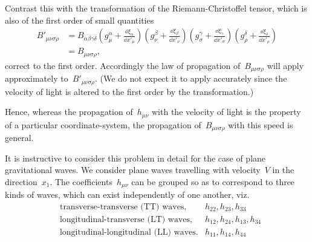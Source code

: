 \documentclass[12pt]{book}
\begin{document}
Contrast this with the transformation of the Riemann-Christoffel tensor, which is also of the first order of small
quantities
\begin{align*}
B'_{\mu\nu\sigma\rho} & = B_{\alpha\beta\gamma\delta}
                              \left(g^\alpha_\mu    + \frac{\dd\xi_\alpha}{\dd x'_\mu}\right)
                              \left(g^\beta_\nu     + \frac{\dd\xi_\beta} {\dd x'_\nu}\right)
                              \left(g^\gamma_\sigma + \frac{\dd\xi_\gamma}{\dd x'_\sigma}\right)
                              \left(g^\delta_\rho   + \frac{\dd\xi_\delta}{\dd x'_\rho}\right)\\
                      & = B_{\mu\nu\sigma\rho},
\end{align*}
correct to the first order.
Accordingly the law of propagation of~$B_{\mu\nu\sigma\rho}$ will apply approximately to~$B'_{\mu\nu\sigma\rho}$.
(We do not expect it to apply accurately since the velocity of light is altered to the first order by the
transformation.)

Hence, whereas the propagation of~$h_{\mu\nu}$ with the velocity of light is the property of a particular
coordinate-system, the propagation of~$B_{\mu\nu\sigma\rho}$ with this speed is general.

It is instructive to consider this problem in detail for the case of plane gravitational waves.
We consider plane waves travelling with velocity~$V$ in the direction~$x_1$.
The coefficients~$h_{\mu\nu}$ can be grouped so as to correspond to three kinds of waves, which can exist
independently of one another, viz.
\begin{align*}%
& \text{transverse-transverse (TT) waves,}     & h_{22}, h_{23}, h_{33}\\
& \text{longitudinal-transverse (LT) waves,}   & h_{12}, h_{24}, h_{13}, h_{34}\\
& \text{longitudinal-longitudinal (LL) waves.} & h_{11}, h_{14}, h_{44}\\
\end{align*}
\end{document}
